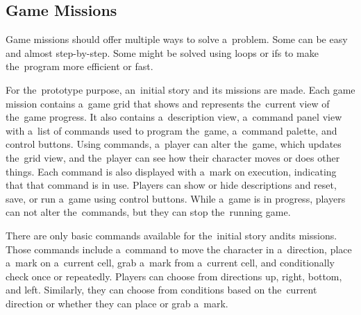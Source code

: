 \subsection{Game Missions}
\label{analysis:game:game-missions}

Game missions should offer multiple ways to solve a~problem.
Some can be easy and almost step-by-step.
Some might be solved using loops or ifs to make the~program more efficient or fast.

For the~prototype purpose, an~initial story and its missions are made.
Each game mission contains a~game grid that shows and represents the~current view of the~game progress.
It also contains a~description view, a~command panel view with a~list of commands used to program the~game, a~command palette, and control buttons.
Using commands, a~player can alter the~game, which updates the~grid view, and the~player can see how their character moves or does other things.
Each command is also displayed with a~mark on execution, indicating that that command is in use.
Players can show or hide descriptions and reset, save, or run a~game using control buttons.
While a~game is in progress, players can not alter the~commands, but they can stop the~running game. 

There are only basic commands available for the~initial story and\linebreak{}its missions.
Those commands include a~command to move the character in a~direction, place a~mark on a~current cell, grab a~mark from a~current cell, and conditionally check once or repeatedly.
Players can choose from directions up, right, bottom, and left.
Similarly, they can choose from conditions based on the~current direction or whether they can place or grab a~mark.  

